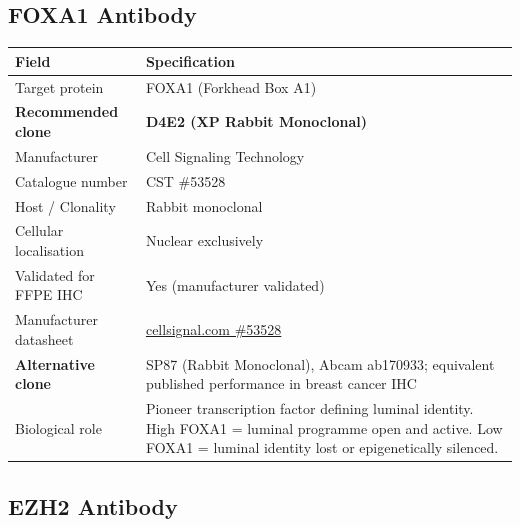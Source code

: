 \documentclass[11pt, a4paper]{article}
\begin{document}
\subsection{FOXA1 Antibody}

\begin{center}
\begin{tabular}{p{4.5cm}p{9cm}}
\toprule
\textbf{Field} & \textbf{Specification} \\
\midrule
Target protein &
FOXA1 (Forkhead Box A1) \\[0.3em]
\textbf{Recommended clone} &
\textbf{D4E2 (XP Rabbit Monoclonal)} \\[0.3em]
Manufacturer &
Cell Signaling Technology \\[0.3em]
Catalogue number &
CST \#53528 \\[0.3em]
Host / Clonality &
Rabbit monoclonal \\[0.3em]
Cellular localisation &
Nuclear exclusively \\[0.3em]
Validated for FFPE IHC &
Yes (manufacturer validated) \\[0.3em]
Manufacturer datasheet &
\href{https://www.cellsignal.com/products/primary-antibodies/foxa1-d4e2-xp-rabbit-mab/53528}
{cellsignal.com \#53528} \\[0.3em]
\textbf{Alternative clone} &
SP87 (Rabbit Monoclonal),
Abcam ab170933;
equivalent published performance
in breast cancer IHC \\[0.3em]
Biological role &
Pioneer transcription factor
defining luminal identity.
High FOXA1 = luminal programme
open and active. Low FOXA1 =
luminal identity lost or
epigenetically silenced. \\
\bottomrule
\end{tabular}
\end{center}

\subsection{EZH2 Antibody}
\end{document}
